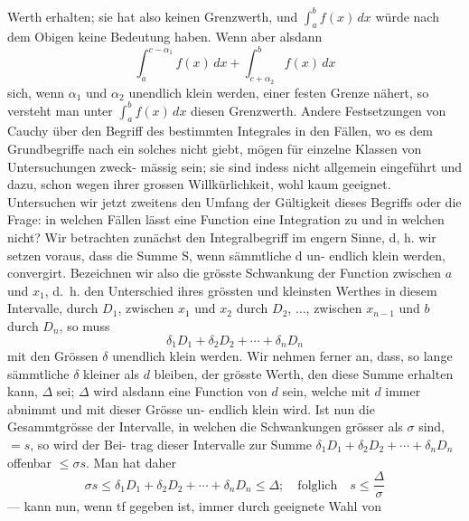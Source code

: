 \documentclass[11pt,a4paper]{article}
\begin{document}
{{%
Werth  erhalten;  sie  hat  also  keinen  Grenzwerth,  und  $\int_a^b f(x)\, dx$  würde
nach  dem  Obigen  keine  Bedeutung  haben.  Wenn  aber  alsdann
\[ \int_a^{c-\alpha_1} f(x)\, dx + \int_{c+\alpha_2}^b f(x)\, dx \]
sich,  wenn  $\alpha_1$  und  $\alpha_2$  unendlich  klein  werden,  einer  festen  Grenze
nähert,  so  versteht  man  unter  $\int_a^b f(x)\, dx$  diesen  Grenzwerth.
Andere  Festsetzungen  von  Cauchy  über  den  Begriff  des  bestimmten
Integrales  in  den  Fällen,  wo  es  dem  Grundbegriffe  nach  ein  solches
nicht  giebt,  mögen  für  einzelne  Klassen  von  Untersuchungen  zweck-
mässig sein;  sie  sind  indess  nicht  allgemein  eingeführt  und  dazu,  schon
wegen  ihrer  grossen  Willkürlichkeit,  wohl  kaum  geeignet.
Untersuchen  wir  jetzt  zweitens  den  Umfang  der  Gültigkeit  dieses
Begriffs  oder  die  Frage:  in  welchen  Fällen  lässt  eine  Function  eine
Integration  zu  und  in  welchen  nicht?
Wir  betrachten  zunächst  den  Integralbegriff  im  engern  Sinne,
d,  h.  wir  setzen  voraus,  dass  die  Summe  S,  wenn  sämmtliche  d  un-
endlich klein  werden,  convergirt.  Bezeichnen  wir  also  die  grösste
Schwankung  der  Function  zwischen  $a$  und  $x_1$,  d.~h.  den  Unterschied
ihres  grössten  und  kleinsten  Werthes  in  diesem  Intervalle,  durch  $D_1$,
zwischen  $x_1$  und  $x_2$  durch  $D_2$,  $\ldots$,  zwischen  $x_{n-1}$  und  $b$  durch  $D_n$,
so  muss
\[ \delta_1 D_1 + \delta_2 D_2 + \cdots + \delta_n D_n \]
mit  den  Grössen  $\delta$  unendlich  klein  werden.  Wir  nehmen  ferner  an,
dass,  so  lange  sämmtliche  $\delta$  kleiner  als  $d$  bleiben,  der  grösste  Werth,
den  diese  Summe  erhalten  kann,  $\Delta$  sei;  $\Delta$  wird  alsdann  eine  Function
von  $d$  sein,  welche  mit  $d$  immer  abnimmt  und  mit  dieser  Grösse  un-
endlich  klein  wird.  Ist  nun  die  Gesammtgrösse  der  Intervalle,  in
welchen  die  Schwankungen  grösser  als  $\sigma$  sind,  $= s$,  so  wird  der  Bei-
trag  dieser  Intervalle  zur  Summe  $\delta_1 D_1 + \delta_2 D_2 + \cdots + \delta_n D_n$  offenbar
$\leq \sigma s$.  Man  hat  daher
\[ \sigma s \leq \delta_1 D_1 + \delta_2 D_2 + \cdots + \delta_n D_n \leq \Delta; \quad \text{folglich} \quad s \leq \frac{\Delta}{\sigma} \]
---  kann  nun,  wenn  tf  gegeben  ist,  immer  durch  geeignete  Wahl  von
\newpage

}}
\end{document}
